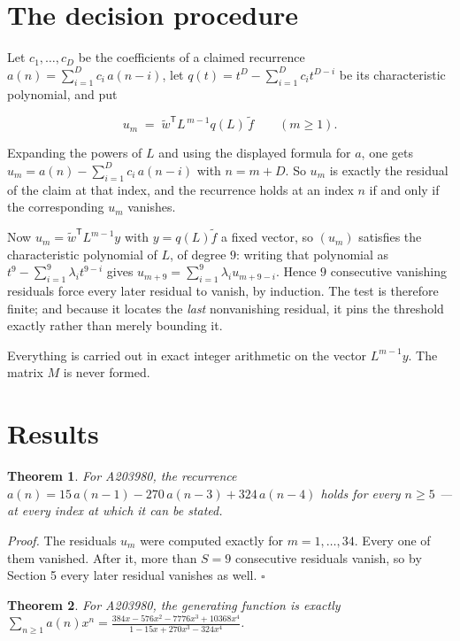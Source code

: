 \documentclass[11pt]{article}
\newtheorem{theorem}{Theorem}
\theoremstyle{definition}
\begin{document}
\section{The decision procedure}

Let $c_1,\dots,c_D$ be the coefficients of a claimed recurrence $a(n) = \sum_{i=1}^{D} c_i\,a(n-i)$, let $q(t) = t^{D} - \sum_{i=1}^{D} c_i t^{D-i}$ be its characteristic polynomial, and put

\[u_m \;=\; \tilde w^{\mathsf T} L^{\,m-1} q(L)\,\tilde f \qquad (m \ge 1).\]

Expanding the powers of $L$ and using the displayed formula for $a$, one gets $u_m = a(n) - \sum_{i=1}^{D} c_i\,a(n-i)$ with $n = m + D$. So $u_m$ is exactly the residual of the claim at that index, and the recurrence holds at an index $n$ if and only if the corresponding $u_m$ vanishes.

Now $u_m = \tilde w^{\mathsf T} L^{m-1} y$ with $y = q(L)\tilde f$ a fixed vector, so $(u_m)$ satisfies the characteristic polynomial of $L$, of degree $9$: writing that polynomial as $t^{9} - \sum_{i=1}^{9} \lambda_i t^{9-i}$ gives $u_{m+9} = \sum_{i=1}^{9} \lambda_i u_{m+9-i}$. Hence $9$ consecutive vanishing residuals force every later residual to vanish, by induction. The test is therefore finite; and because it locates the {\itshape last} nonvanishing residual, it pins the threshold exactly rather than merely bounding it.

Everything is carried out in exact integer arithmetic on the vector $L^{m-1}y$. The matrix $M$ is never formed.

\section{Results}

\begin{theorem} For A203980, the recurrence $a(n) = 15\,a(n-1) - 270\,a(n-3) + 324\,a(n-4)$ holds for every $n \ge 5$ --- at every index at which it can be stated.\end{theorem}

{\itshape Proof.} The residuals $u_m$ were computed exactly for $m = 1,\dots,34$. Every one of them vanished. After it, more than $S = 9$ consecutive residuals vanish, so by Section 5 every later residual vanishes as well. $\square$

\begin{theorem} For A203980, the generating function is exactly $\sum_{n\ge 1} a(n)x^n = \frac{384x - 576x^{2} - 7776x^{3} + 10368x^{4}}{1 - 15x + 270x^{3} - 324x^{4}}$.\end{theorem}
\end{document}
